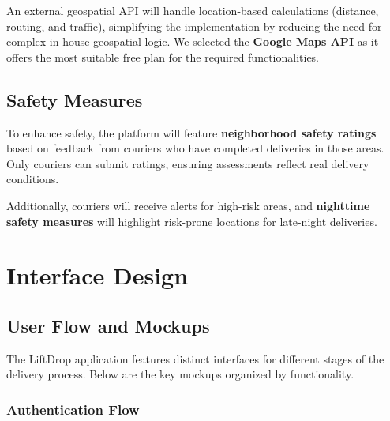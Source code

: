 \documentclass[a4paper,twoside,11pt]{article}
\begin{document}
An external geospatial API will handle location-based calculations (distance, routing, and traffic), simplifying the implementation by reducing the need for complex in-house geospatial logic. We selected the \textbf{Google Maps API} as it offers the most suitable free plan for the required functionalities.

\subsection{Safety Measures}  

To enhance safety, the platform will feature \textbf{neighborhood safety ratings} based on feedback from couriers who have completed deliveries in those areas. Only couriers can submit ratings, ensuring assessments reflect real delivery conditions.  

Additionally, couriers will receive alerts for high-risk areas, and \textbf{nighttime safety measures} will highlight risk-prone locations for late-night deliveries.

\newpage 

\section{Interface Design}
\subsection{User Flow and Mockups}

The LiftDrop application features distinct interfaces for different stages of the delivery process. Below are the key mockups organized by functionality.

\subsubsection{Authentication Flow}
\end{document}
